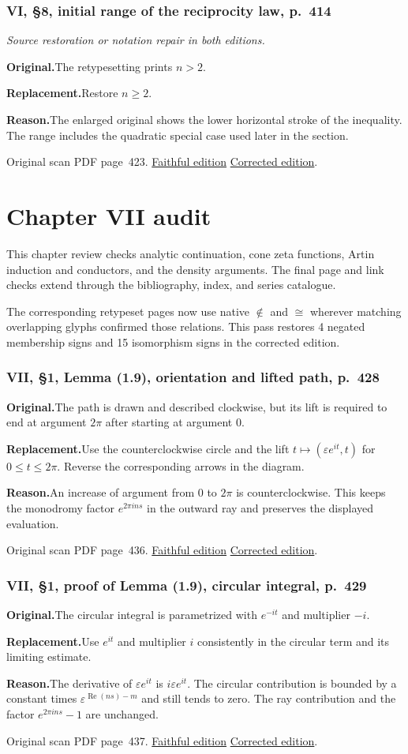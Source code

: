 \documentclass[11pt,a4paper]{article}
\newcommand{\original}{\par\smallskip\noindent\textbf{Original.}\enspace}
\newcommand{\replacement}{\par\smallskip\noindent\textbf{Replacement.}\enspace}
\newcommand{\reason}{\par\smallskip\noindent\textbf{Reason.}\enspace}
\newcommand{\editionlink}[3]{\href{#1\#errata.#2}{#3}}
\newcommand{\location}[2]{%
  \par\smallskip\noindent Original scan PDF page~#2.\enspace
  \editionlink{Neukirch_Faithful.pdf}{#1}{Faithful edition}
  \quad\editionlink{Neukirch_Corrected.pdf}{#1}{Corrected edition}.}
\begin{document}
\setcounter{section}{145}
\section{VI, \S8, initial range of the reciprocity law, p.~414}\label{errata:item:146}
\noindent\emph{Source restoration or notation repair in both editions.}\par
\original The retypesetting prints $n>2$.
\replacement Restore $n\ge2$.
\reason The enlarged original shows the lower horizontal stroke of the inequality. The range includes the quadratic special case used later in the section.
\location{146}{423}


\clearpage
\part{Chapter VII audit}
This chapter review checks analytic continuation, cone zeta functions, Artin induction and conductors, and the density arguments. The final page and link checks extend through the bibliography, index, and series catalogue.\par The corresponding retypeset pages now use native \(\notin\) and \(\cong\) wherever matching overlapping glyphs confirmed those relations. This pass restores 4 negated membership signs and 15 isomorphism signs in the corrected edition.
\setcounter{section}{146}
\section{VII, \S1, Lemma (1.9), orientation and lifted path, p.~428}\label{errata:item:147}

\original The path is drawn and described clockwise, but its lift is required to end at argument $2\pi$ after starting at argument $0$.
\replacement Use the counterclockwise circle and the lift $t\mapsto(\varepsilon e^{it},t)$ for $0\le t\le2\pi$. Reverse the corresponding arrows in the diagram.
\reason An increase of argument from $0$ to $2\pi$ is counterclockwise. This keeps the monodromy factor $e^{2\pi ins}$ in the outward ray and preserves the displayed evaluation.
\location{147}{436}

\setcounter{section}{147}
\section{VII, \S1, proof of Lemma (1.9), circular integral, p.~429}\label{errata:item:148}

\original The circular integral is parametrized with $e^{-it}$ and multiplier $-i$.
\replacement Use $e^{it}$ and multiplier $i$ consistently in the circular term and its limiting estimate.
\reason The derivative of $\varepsilon e^{it}$ is $i\varepsilon e^{it}$. The circular contribution is bounded by a constant times $\varepsilon^{\operatorname{Re}(ns)-m}$ and still tends to zero. The ray contribution and the factor $e^{2\pi ins}-1$ are unchanged.
\location{148}{437}
\end{document}
